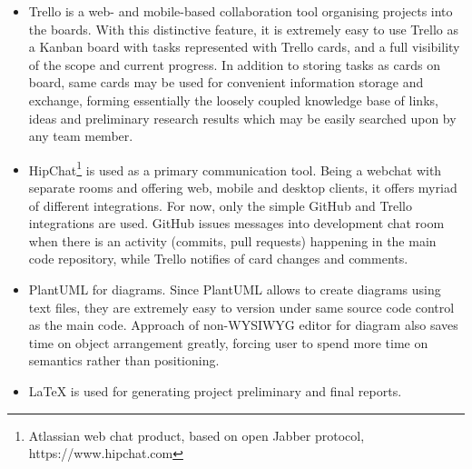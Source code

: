 \begin{itemize}
	\item Trello is a web- and mobile-based collaboration tool organising projects into the boards. With this distinctive feature, it is extremely easy to use Trello as a
	Kanban board with tasks represented with Trello cards, and a full visibility of the scope and current progress. In addition to storing tasks as cards on board, same cards
	may be used for convenient information storage and exchange, forming essentially the loosely coupled knowledge base of links, ideas and preliminary research
	results which may be easily searched upon by any team member.
	\item HipChat\footnote{Atlassian web chat product, based on open Jabber protocol, https://www.hipchat.com} is used as a primary communication tool. Being a webchat with separate rooms and offering web, mobile and desktop clients, it offers myriad of different integrations. For now, only the simple GitHub and Trello integrations are used. GitHub issues messages into development chat room when there is an activity (commits, pull requests) happening in the main code repository, while Trello notifies of card changes and comments.
	\item PlantUML for diagrams. Since PlantUML allows to create diagrams using text files, they are extremely easy to version under same source code control as the main code. Approach of non-WYSIWYG editor for diagram also saves time on object arrangement greatly, forcing user to spend more time on semantics rather than positioning.
	\item LaTeX is used for generating project preliminary and final reports.
\end{itemize}